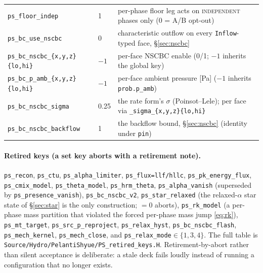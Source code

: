 \documentclass[11pt,a4paper]{article}
\newcommand{\code}[1]{\texttt{\small #1}}
\begin{document}
\begin{center}
\begin{tabular}{@{}ll>{\raggedright\arraybackslash}p{}@{}}
\code{ps\_floor\_indep}      & 1 & per-phase floor leg acts on \textsc{independent} phases only (0 = A/B opt-out) \\
\code{ps\_bc\_use\_nscbc}    & 0 & characteristic outflow on every \code{Inflow}-typed face, \S\ref{sec:nscbc} \\
\code{ps\_bc\_nscbc\_\{x,y,z\}\{lo,hi\}} & $-1$ & per-face NSCBC enable (0/1; $-1$ inherits the global key) \\
\code{ps\_bc\_p\_amb\_\{x,y,z\}\{lo,hi\}} & $-1$ & per-face ambient pressure [Pa] ($-1$ inherits \code{prob.p\_amb}) \\
\code{ps\_bc\_nscbc\_sigma}  & 0.25 & the rate form's $\sigma$ (Poinsot--Lele); per face via \code{\_sigma\_\{x,y,z\}\{lo,hi\}} \\
\code{ps\_bc\_nscbc\_backflow} & 1 & the backflow bound, \S\ref{sec:nscbc} (identity under \code{pin}) \\
\bottomrule
\end{tabular}
\end{center}

\paragraph{Retired keys (a set key aborts with a retirement note).}
\code{ps\_recon}, \code{ps\_ctu}, \code{ps\_alpha\_limiter},
\code{ps\_flux=llf/hllc}, \code{ps\_pk\_energy\_flux},
\code{ps\_cmix\_model}, \code{ps\_theta\_model}, \code{ps\_hrm\_theta},
\code{ps\_alpha\_vanish} (superseded by \code{ps\_presence\_vanish}),
\code{ps\_bc\_nscbc\_v2}, \code{ps\_star\_relaxed} (the relaxed-$\alpha$
star state of \S\ref{sec:star} is the only construction; $=0$ aborts),
\code{ps\_rk\_model} (a per-phase mass partition that violated the forced
per-phase mass jump \eqref{eq:rk}), \code{ps\_mt\_target},
\code{ps\_src\_p\_reproject}, \code{ps\_relax\_hyst},
\code{ps\_bc\_nscbc\_flash}, \code{ps\_mech\_kernel},
\code{ps\_mech\_close}, and \code{ps\_relax\_mode}$\in\{1,3,4\}$.  The
full table is \code{Source/Hydro/PelantiShyue/PS\_retired\_keys.H}.  Retirement-by-abort rather than silent
acceptance is deliberate: a stale deck fails loudly instead of running a
configuration that no longer exists.
\end{document}
